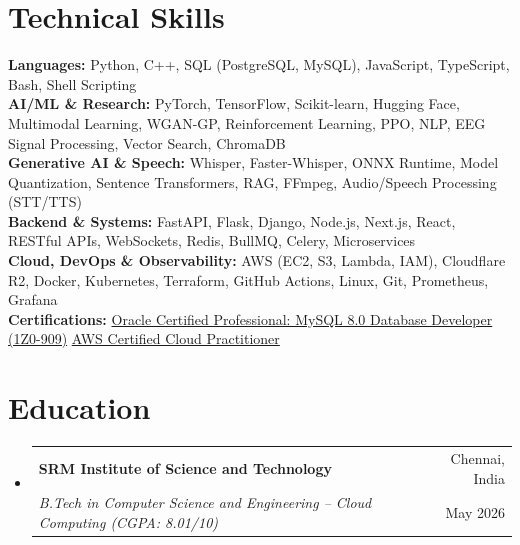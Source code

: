 \documentclass[letterpaper,10pt]{article}
\makeatletter
\newcommand{\resumeSubheading}[4]{
  \vspace{-3pt}\item
    \begin{tabular*}{\textwidth}[t]{l@{\extracolsep{\fill}}r}
      \small\textbf{\color{inkprimary}#1} & \small\color{inksecondary}#2 \\
      \textit{\small\color{inkprimary}#3} & \small\color{inksecondary}#4 \\
    \end{tabular*}\vspace{-4.5pt}
}
\newcommand{\resumeSubHeadingListStart}{\begin{itemize}[leftmargin=0.0in, label={}]}
\newcommand{\resumeSubHeadingListEnd}{\end{itemize}\vspace{-4pt}}
\makeatother
\begin{document}
\section{Technical Skills}
 \begin{itemize}[leftmargin=0.0in, label={}]
    \small{\item{
     \textbf{Languages:} Python, C++, SQL (PostgreSQL, MySQL), JavaScript, TypeScript, Bash, Shell Scripting \\ \vspace{1.5pt}
     \textbf{AI/ML \& Research:} PyTorch, TensorFlow, Scikit-learn, Hugging Face, Multimodal Learning, WGAN-GP, Reinforcement Learning, PPO, NLP, EEG Signal Processing, Vector Search, ChromaDB \\ \vspace{1.5pt}
     \textbf{Generative AI \& Speech:} Whisper, Faster-Whisper, ONNX Runtime, Model Quantization, Sentence Transformers, RAG, FFmpeg, Audio/Speech Processing (STT/TTS) \\ \vspace{1.5pt}
     \textbf{Backend \& Systems:} FastAPI, Flask, Django, Node.js, Next.js, React, RESTful APIs, WebSockets, Redis, BullMQ, Celery, Microservices \\ \vspace{1.5pt}
     \textbf{Cloud, DevOps \& Observability:} AWS (EC2, S3, Lambda, IAM), Cloudflare R2, Docker, Kubernetes, Terraform, GitHub Actions, Linux, Git, Prometheus, Grafana \\ \vspace{1.5pt}
     \textbf{Certifications:} \href{https://catalog-education.oracle.com/pls/certview/sharebadge?id=612702728476686D7B2D24830AC8D7769D0C9345E82B11C94343869FEEB8DF92}{Oracle Certified Professional: MySQL 8.0 Database Developer (1Z0-909)} \enspace\textbullet\enspace \href{https://www.credly.com/badges/3dc45737-a240-4ebd-865c-ac932ab9d71c/public_url}{AWS Certified Cloud Practitioner}
    }}
 \end{itemize}
\vspace{-5pt}

\section{Education}
  \resumeSubHeadingListStart
    \resumeSubheading
      {SRM Institute of Science and Technology}{Chennai, India}
      {B.Tech in Computer Science and Engineering -- Cloud Computing \textnormal{(CGPA: 8.01/10)}}{May 2026}
  \resumeSubHeadingListEnd

\end{document}
